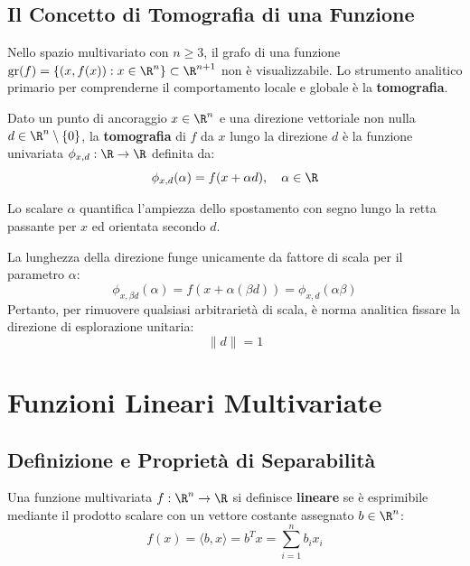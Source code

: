 \subsection{Il Concetto di Tomografia di una Funzione}
Nello spazio multivariato con $n \ge 3$, il grafo di una funzione $\text{gr}(f) = \{(x, f(x)) : x \in \R^n\} \subset \R^{n+1}$ non \`e visualizzabile. Lo strumento analitico primario per comprenderne il comportamento locale e globale \`e la \textbf{tomografia}.

\begin{definition}
Dato un punto di ancoraggio $x \in \R^n$ e una direzione vettoriale non nulla $d \in \R^n \setminus \{0\}$, la \textbf{tomografia} di $f$ da $x$ lungo la direzione $d$ \`e la funzione univariata $\phi_{x, d}: \R \to \R$ definita da:
\begin{equation}
\phi_{x, d}(\alpha) = f(x + \alpha d), \quad \alpha \in \R
\end{equation}
\end{definition}

Lo scalare $\alpha$ quantifica l'ampiezza dello spostamento con segno lungo la retta passante per $x$ ed orientata secondo $d$. 

La lunghezza della direzione funge unicamente da fattore di scala per il parametro $\alpha$:
\begin{equation}
\phi_{x, \beta d}(\alpha) = f(x + \alpha (\beta d)) = \phi_{x, d}(\alpha \beta)
\end{equation}
Pertanto, per rimuovere qualsiasi arbitrariet\`a di scala, \`e norma analitica fissare la direzione di esplorazione unitaria:
\begin{equation}
\|d\| = 1
\end{equation}


\FloatBarrier
\section{Funzioni Lineari Multivariate}
\label{sec:opt-funzioni-lineari-multivariate}

\subsection{Definizione e Propriet\`a di Separabilit\`a}
Una funzione multivariata $f: \R^n \to \R$ si definisce \textbf{lineare} se \`e esprimibile mediante il prodotto scalare con un vettore costante assegnato $b \in \R^n$:
\begin{equation}
f(x) = \langle b, x \rangle = b^T x = \sum_{i=1}^n b_i x_i
\end{equation}

